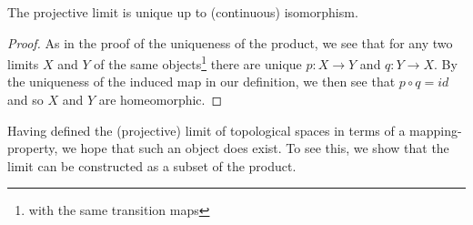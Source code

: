         \begin{claim}
          The projective limit is unique up to (continuous) isomorphism.
          \begin{proof}
            As in the proof of the uniqueness of the product, we see that for any two limits $X$ and $Y$ of the same objects\footnote{with the same transition maps} there are unique $p:X\rightarrow Y$ and $q:Y\rightarrow X$.
            By the uniqueness of the induced map in our definition, we then see that $p\circ q=id$ and so $X$ and $Y$ are homeomorphic.
          \end{proof}
        \end{claim}

        Having defined the (projective) limit of topological spaces in terms of a mapping-property, we hope that such an object does exist.
        To see this, we show that the limit can be constructed as a subset of the product.
